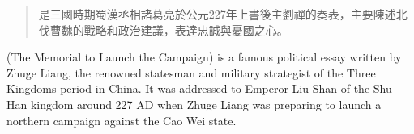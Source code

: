 
\begin{abstract}       

是三國時期蜀漢丞相諸葛亮於公元227年上書後主劉禪的奏表，主要陳述北伐曹魏的戰略和政治建議，表達忠誠與憂國之心。

\end{abstract}

\begin{abstract*}

(The Memorial to Launch the Campaign) is a famous political essay written by Zhuge Liang, the renowned statesman and military strategist of the Three Kingdoms period in China. It was addressed to Emperor Liu Shan of the Shu Han kingdom around 227 AD when Zhuge Liang was preparing to launch a northern campaign against the Cao Wei state.

\end{abstract*}